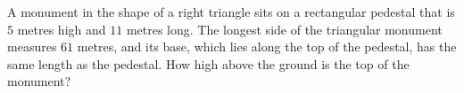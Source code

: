 A monument in the shape of a right triangle sits on a rectangular pedestal that is $5$ metres high and $11$ metres long. The longest side of the triangular monument measures $61$ metres, and its base, which lies along the top of the pedestal, has the same length as the pedestal. How high above the ground is the top of the monument?
